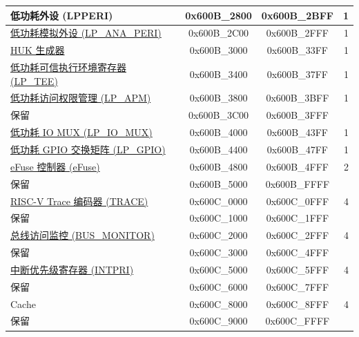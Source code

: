\begin{ThreePartTable}
\begin{longtable}[c]{ |p{7cm}|c|c|r| }
    低功耗外设 (LPPERI)                      & 0x600B\_2800 & 0x600B\_2BFF &   1     \\\hline
    \hyperref[mod:lowpowm]{低功耗模拟外设 (LP\_ANA\_PERI)}               & 0x600B\_2C00 & 0x600B\_2FFF &   1     \\\hline
    \hyperref[mod:keymng]{HUK 生成器}                    & 0x600B\_3000 & 0x600B\_33FF &   1    \\\hline
    \hyperref[mod:permctrl]{低功耗可信执行环境寄存器 (LP\_TEE)} \tnote{\textcolor{red}{2}}                     & 0x600B\_3400 & 0x600B\_37FF &   1    \\\hline
    \hyperref[mod:permctrl]{低功耗访问权限管理 (LP\_APM)} \tnote{\textcolor{red}{2}}                     & 0x600B\_3800 & 0x600B\_3BFF &   1     \\\hline
        \rowcolor{gray!25}  保留                    & 0x600B\_3C00 & 0x600B\_3FFF &         \\\hline
    \hyperref[mod:iomuxgpio]{低功耗 IO MUX (LP\_IO\_MUX)}                     & 0x600B\_4000 & 0x600B\_43FF &   1     \\\hline
    \hyperref[mod:iomuxgpio]{低功耗 GPIO 交换矩阵 (LP\_GPIO)}                     & 0x600B\_4400 & 0x600B\_47FF &   1     \\\hline
    \hyperref[mod:efuse]{eFuse 控制器 (eFuse)}                       & 0x600B\_4800 & 0x600B\_4FFF &   2     \\\hline
        \rowcolor{gray!25}  保留                    & 0x600B\_5000 & 0x600B\_FFFF &         \\\hline
    \hyperref[mod:riscvtracenc]{RISC-V Trace 编码器 (TRACE)}                       & 0x600C\_0000 & 0x600C\_0FFF &   4     \\\hline
        \rowcolor{gray!25}  保留                    & 0x600C\_1000 & 0x600C\_1FFF &         \\\hline
    \hyperref[mod:dbgassist]{总线访问监控 (BUS\_MONITOR) \tnote{\textcolor{red}{2}}}               & 0x600C\_2000 & 0x600C\_2FFF &   4     \\\hline
        \rowcolor{gray!25}  保留                    & 0x600C\_3000 & 0x600C\_4FFF &         \\\hline
    \hyperref[mod:riscvcpu]{中断优先级寄存器 (INTPRI)}                & 0x600C\_5000 & 0x600C\_5FFF &   4     \\\hline
        \rowcolor{gray!25}  保留                    & 0x600C\_6000 & 0x600C\_7FFF &         \\\hline
    Cache                & 0x600C\_8000 & 0x600C\_8FFF &   4     \\\hline
        \rowcolor{gray!25}  保留                    & 0x600C\_9000 & 0x600C\_FFFF &         \\\hline
        
    \end{longtable}
    \end{ThreePartTable}
    